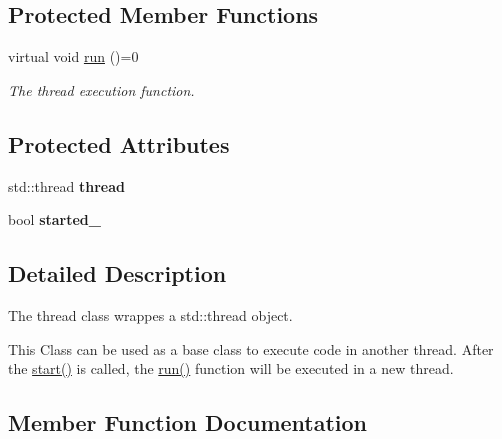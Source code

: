 \subsection*{Protected Member Functions}
\begin{DoxyCompactItemize}
\item 
virtual void \hyperlink{classow_1_1Thread_a993b565d454ecc15634db8cec75b71d4}{run} ()=0\hypertarget{classow_1_1Thread_a993b565d454ecc15634db8cec75b71d4}{}\label{classow_1_1Thread_a993b565d454ecc15634db8cec75b71d4}

\begin{DoxyCompactList}\small\item\em The thread execution function. \end{DoxyCompactList}\end{DoxyCompactItemize}
\subsection*{Protected Attributes}
\begin{DoxyCompactItemize}
\item 
std\+::thread {\bfseries thread}\hypertarget{classow_1_1Thread_a586bc9446475a6892452d10988d17f30}{}\label{classow_1_1Thread_a586bc9446475a6892452d10988d17f30}

\item 
bool {\bfseries started\+\_\+}\hypertarget{classow_1_1Thread_afd8d0781e303d470982b8be256ddb7c8}{}\label{classow_1_1Thread_afd8d0781e303d470982b8be256ddb7c8}

\end{DoxyCompactItemize}


\subsection{Detailed Description}
The thread class wrappes a std\+::thread object. 

This Class can be used as a base class to execute code in another thread. After the \hyperlink{classow_1_1Thread_a13f66e05bb62b44d388a71261ecbb167}{start()} is called, the \hyperlink{classow_1_1Thread_a993b565d454ecc15634db8cec75b71d4}{run()} function will be executed in a new thread. 

\subsection{Member Function Documentation}
